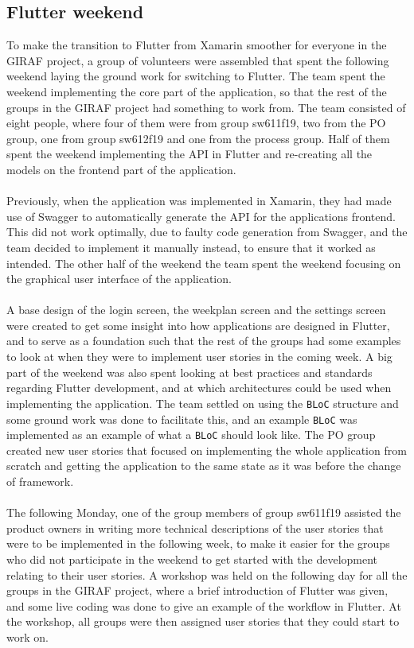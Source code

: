 \subsection{Flutter weekend}
To make the transition to Flutter from Xamarin smoother for everyone in the GIRAF project, a group of volunteers were assembled that spent the following weekend laying the ground work for switching to Flutter. 
The team spent the weekend implementing the core part of the application, so that the rest of the groups in the GIRAF project had something to work from. 
The team consisted of eight people, where four of them were from group sw611f19, two from the PO group, one from group sw612f19 and one from the process group.
Half of them spent the weekend implementing the API in Flutter and re-creating all the models on the frontend part of the application. \\\\
Previously, when the application was implemented in Xamarin, they had made use of Swagger to automatically generate the API for the applications frontend.
This did not work optimally, due to faulty code generation from Swagger, and the team decided to implement it manually instead, to ensure that it worked as intended.
The other half of the weekend the team spent the weekend focusing on the graphical user interface of the application. \\\\
A base design of the login screen, the weekplan screen and the settings screen were created to get some insight into how applications are designed in Flutter, and to serve as a foundation such that the rest of the groups had some examples to look at when they were to implement user stories in the coming week.
A big part of the weekend was also spent looking at best practices and standards regarding Flutter development, and at which architectures could be used when implementing the application.
The team settled on using the \texttt{BLoC} structure and some ground work was done to facilitate this, and an example \texttt{BLoC} was implemented as an example of what a \texttt{BLoC} should look like.
The PO group created new user stories that focused on implementing the whole application from scratch and getting the application to the same state as it was before the change of framework.\\\\
The following Monday, one of the group members of group sw611f19 assisted the product owners in writing more technical descriptions of the user stories that were to be implemented in the following week, to make it easier for the groups who did not participate in the weekend to get started with the development relating to their user stories.
A workshop was held on the following day for all the groups in the GIRAF project, where a brief introduction of Flutter was given, and some live coding was done to give an example of the workflow in Flutter.
At the workshop, all groups were then assigned user stories that they could start to work on.
